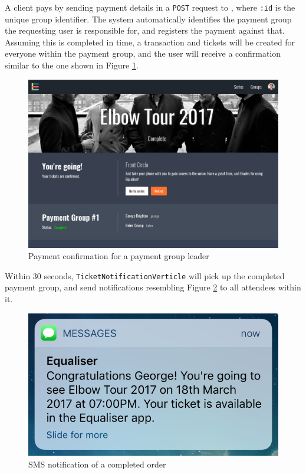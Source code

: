\documentclass[12pt,a4paper]{bhamdissertation}
\newcommand{\code}[1]{\texttt{#1}}
\begin{document}
A client pays by sending payment details in a \code{POST} request to \code{}, where \code{:id} is the unique group identifier. The system automatically identifies the payment group the requesting user is responsible for, and registers the payment against that. Assuming this is completed in time, a transaction and tickets will be created for everyone within the payment group, and the user will receive a confirmation similar to the one shown in Figure \ref{img:going}.

\begin{figure}[!htbp]
    \centering
    \includegraphics[width=1\linewidth]{img/going.png}
    \caption{Payment confirmation for a payment group leader}
    \label{img:going}
\end{figure}

Within 30 seconds, \code{TicketNotificationVerticle} will pick up the completed payment group, and send notifications resembling Figure \ref{img:ticket_confirmation} to all attendees within it.

\begin{figure}[!htbp]
    \centering
    \includegraphics[width=.6\linewidth]{img/ticket_confirmation.png}
    \caption{SMS notification of a completed order}
    \label{img:ticket_confirmation}
\end{figure}
\end{document}
